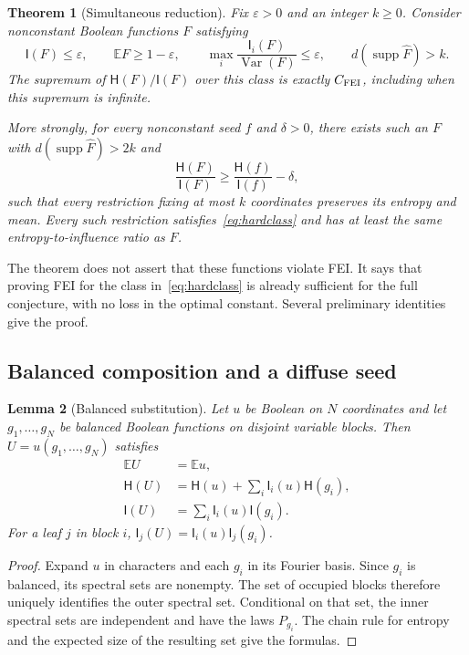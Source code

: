 \documentclass[11pt]{amsart}
\newtheorem{theorem}{Theorem}[section]
\newtheorem{lemma}[theorem]{Lemma}
\theoremstyle{definition}
\theoremstyle{remark}
\newcommand{\E}{\mathbb E}
\newcommand{\HH}{\mathsf H}
\newcommand{\I}{\mathsf I}
\newcommand{\wh}[1]{\widehat{#1}}
\newcommand{\eps}{\varepsilon}
\newcommand{\supp}{\operatorname{supp}}
\newcommand{\Var}{\operatorname{Var}}
\begin{document}
\begin{theorem}[Simultaneous reduction]\label{thm:simultaneous}
Fix $\eps>0$ and an integer $k\ge0$. Consider nonconstant Boolean functions $F$ satisfying
\begin{equation}\label{eq:hardclass}
 \I(F)\le\eps,\qquad
 \E F\ge1-\eps,\qquad
 \max_i\frac{\I_i(F)}{\Var(F)}\le\eps,
 \qquad d(\supp\wh F)>k.
\end{equation}
The supremum of $\HH(F)/\I(F)$ over this class is exactly $C_{\rm FEI}$, including when this supremum is infinite.

More strongly, for every nonconstant seed $f$ and $\delta>0$, there exists such an $F$ with $d(\supp\wh F)>2k$ and
\[
 \frac{\HH(F)}{\I(F)}\ge\frac{\HH(f)}{\I(f)}-\delta,
\]
such that every restriction fixing at most $k$ coordinates preserves its entropy and mean. Every such restriction satisfies~\eqref{eq:hardclass} and has at least the same entropy-to-influence ratio as $F$.
\end{theorem}

The theorem does not assert that these functions violate FEI. It says that proving FEI for the class in~\eqref{eq:hardclass} is already sufficient for the full conjecture, with no loss in the optimal constant. Several preliminary identities give the proof.

\subsection{Balanced composition and a diffuse seed}

\begin{lemma}[Balanced substitution]\label{lem:balanced}
Let $u$ be Boolean on $N$ coordinates and let $g_1,\ldots,g_N$ be balanced Boolean functions on disjoint variable blocks. Then $U=u(g_1,\ldots,g_N)$ satisfies
\begin{align}
 \E U&=\E u,\label{eq:compmean}\\
 \HH(U)&=\HH(u)+\sum_i\I_i(u)\HH(g_i),\label{eq:comph}\\
 \I(U)&=\sum_i\I_i(u)\I(g_i).\label{eq:compi}
\end{align}
For a leaf $j$ in block $i$, $\I_j(U)=\I_i(u)\I_j(g_i)$.
\end{lemma}
\begin{proof}
Expand $u$ in characters and each $g_i$ in its Fourier basis. Since $g_i$ is balanced, its spectral sets are nonempty. The set of occupied blocks therefore uniquely identifies the outer spectral set. Conditional on that set, the inner spectral sets are independent and have the laws $P_{g_i}$. The chain rule for entropy and the expected size of the resulting set give the formulas.
\end{proof}
\end{document}
